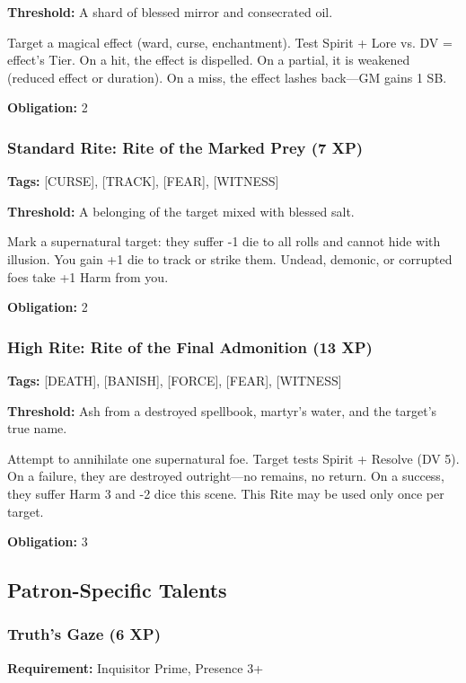 \textbf{Threshold:} A shard of blessed mirror and consecrated oil.

Target a magical effect (ward, curse, enchantment). Test Spirit + Lore vs. DV = effect's Tier. On a hit, the effect is dispelled. On a partial, it is weakened (reduced effect or duration). On a miss, the effect lashes back—GM gains 1 SB.

\textbf{Obligation:} 2

\subsubsection{Standard Rite: Rite of the Marked Prey (7 XP)}

\textbf{Tags:} [CURSE], [TRACK], [FEAR], [WITNESS]

\textbf{Threshold:} A belonging of the target mixed with blessed salt.

Mark a supernatural target: they suffer -1 die to all rolls and cannot hide with illusion. You gain +1 die to track or strike them. Undead, demonic, or corrupted foes take +1 Harm from you.

\textbf{Obligation:} 2

\subsubsection{High Rite: Rite of the Final Admonition (13 XP)}

\textbf{Tags:} [DEATH], [BANISH], [FORCE], [FEAR], [WITNESS]

\textbf{Threshold:} Ash from a destroyed spellbook, martyr's water, and the target's true name.

Attempt to annihilate one supernatural foe. Target tests Spirit + Resolve (DV 5). On a failure, they are destroyed outright—no remains, no return. On a success, they suffer Harm 3 and -2 dice this scene. This Rite may be used only once per target.

\textbf{Obligation:} 3

\subsection{Patron-Specific Talents}

\subsubsection{Truth's Gaze (6 XP)}

\textbf{Requirement:} Inquisitor Prime, Presence 3+

